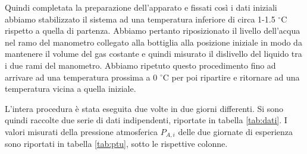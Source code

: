 Quindi completata la preparazione dell'apparato e fissati così i dati iniziali abbiamo stabilizzato il sistema ad una temperatura inferiore di circa 1-1.5 $^\circ$C rispetto a quella di partenza. Abbiamo pertanto riposizionato il livello dell'acqua nel ramo del manometro collegato alla bottiglia alla posizione iniziale in modo da mantenere il volume del gas costante e quindi misurato il dislivello del liquido tra i due rami del manometro.
Abbiamo ripetuto questo procedimento fino ad arrivare ad una temperatura prossima a 0 $^\circ$C per poi ripartire e ritornare ad una temperatura vicina a quella iniziale.

L'intera procedura è stata eseguita due volte in due giorni differenti. Si sono quindi raccolte due serie di dati indipendenti, riportate
in tabella \ref{tab:dati}. I valori misurati della pressione atmosferica $P_{A,i}$ delle due giornate di esperienza sono
riportati in tabella \ref{tab:ptu}, sotto le rispettive colonne.

